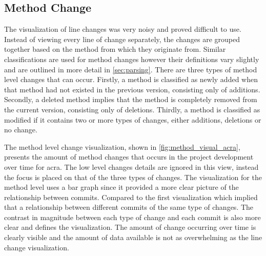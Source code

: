 \subsection{Method Change}

The visualization of line changes was very noisy and proved difficult to use. Instead of viewing every line of change separately, the changes are grouped together based on the method from which they originate from. Similar classifications are used for method changes however their definitions vary slightly and are outlined in more detail in \autoref{sec:parsing}. There are three types of method level changes that can occur. Firstly, a method is classified as newly added when that method had not existed in the previous version, consisting only of additions. Secondly, a deleted method implies that the method is completely removed from the current version, consisting only of deletions. Thirdly, a method is classified as modified if it contains two or more types of changes, either additions, deletions or no change.

The method level change visualization, shown in \autoref{fig:method_visual_acra}, presents the amount of method changes that occurs in the project development over time for acra. The low level changes details are ignored in this view, instead the focus is placed on that of the three types of changes. The visualization for the method level uses a bar graph since it provided a more clear picture of the relationship between commits. Compared to the first visualization which implied that a relationship between different commits of the same type of changes. The contrast in magnitude between each type of change and each commit is also more clear and defines the visualization. The amount of change occurring over time is clearly visible and the amount of data available is not as overwhelming as the line change visualization.


